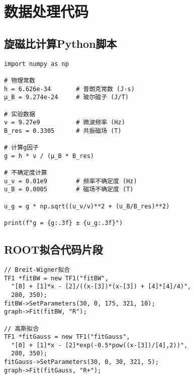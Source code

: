 \documentclass{thuemp}
\begin{document}
\let\OLDthebibliography\thebibliography
\renewcommand\thebibliography[1]{
  \OLDthebibliography{#1}
  \setlength{\parskip}{0pt}
  \setlength{\itemsep}{0pt plus 0.3ex}
}

{
\renewcommand{\baselinestretch}{0.9}
\liuhao


}

\appendix
\section{数据处理代码}

\subsection{旋磁比计算Python脚本}
\begin{verbatim}
import numpy as np

# 物理常数
h = 6.626e-34       # 普朗克常数 (J·s)
μ_B = 9.274e-24     # 玻尔磁子 (J/T)

# 实验数据
ν = 9.27e9          # 微波频率 (Hz)
B_res = 0.3305      # 共振磁场 (T)

# 计算g因子
g = h * ν / (μ_B * B_res)

# 不确定度计算
u_ν = 0.01e9        # 频率不确定度 (Hz)
u_B = 0.0005        # 磁场不确定度 (T)

u_g = g * np.sqrt((u_ν/ν)**2 + (u_B/B_res)**2)

print(f"g = {g:.3f} ± {u_g:.3f}")
\end{verbatim}

\subsection{ROOT拟合代码片段}
\begin{verbatim}
// Breit-Wigner拟合
TF1 *fitBW = new TF1("fitBW", 
  "[0] + [1]*x - [2]/((x-[3])*(x-[3]) + [4]*[4]/4)", 
  280, 350);
fitBW->SetParameters(30, 0, 175, 321, 10);
graph->Fit(fitBW, "R");

// 高斯拟合
TF1 *fitGauss = new TF1("fitGauss", 
  "[0] + [1]*x - [2]*exp(-0.5*pow((x-[3])/[4],2))", 
  280, 350);
fitGauss->SetParameters(30, 0, 30, 321, 5);
graph->Fit(fitGauss, "R+");
\end{verbatim}
\end{document}
